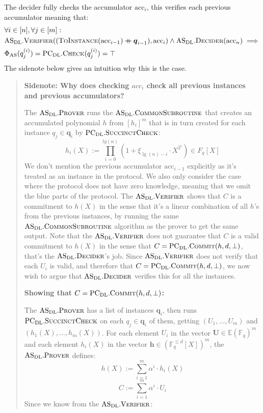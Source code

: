 \documentclass[
]{article}
\newcommand*\Fb{\mathbb{F}}
\newcommand*\Eb{\mathbb{E}}
\renewcommand*\a{\alpha}
\newcommand*\cat{\mathbin{+\mkern-10mu+}}
\renewcommand{\vec}[1]{ \boldsymbol{#1} }
\newcommand*{\acc}{\mathrm{acc}}
\newcommand*{\ToInstance}{\mathrm{\text{T\scriptsize O}\text{I\scriptsize NSTANCE}}}
\newcommand*{\Commit}{\mathrm{\text{C{\scriptsize OMMIT}}}}
\newcommand*{\AS}{\text{AS}}
\newcommand*{\PCDL}{\text{PC}_{\text{DL}}}
\newcommand*{\PCDLCommit}{\PCDL.\Commit}
\newcommand*{\PCDLSuccinctCheck}{\PCDL.\mathrm{\text{S{\scriptsize UCCINCT}C{\scriptsize HECK}}}}
\newcommand*{\PCDLCheck}{\PCDL.\mathrm{\text{C\scriptsize HECK}}}
\newcommand*{\ASDL}{\text{AS}_{\text{DL}}}
\newcommand*{\ASDLCommonSubroutine}{\ASDL.\mathrm{\text{C{\scriptsize OMMON}S{\scriptsize UBROUTINE}}}}
\newcommand*{\ASDLProver}{\ASDL.\mathrm{\text{P\scriptsize ROVER}}}
\newcommand*{\ASDLVerifier}{\ASDL.\mathrm{\text{V\scriptsize ERIFIER}}}
\newcommand*{\ASDLDecider}{\ASDL.\mathrm{\text{D\scriptsize ECIDER}}}
\begin{document}
The decider fully checks the accumulator \(\acc_i\), this verifies each
previous accumulator meaning that: \[
\begin{aligned}
  &\forall i \in [n], \forall j \in [m] : \\
  &\ASDLVerifier((\ToInstance(\acc_{i-1}) \cat \vec{q}_{i-1}), \acc_i) \land \ASDLDecider(\acc_n) \implies \\
  &\Phi_\AS(q^{(i)}_j) = \PCDLCheck(q^{(i)}_j) = \top
\end{aligned}
\] The sidenote below gives an intuition why this is the case.

\begin{quote}
\color{GbGrey}

\textbf{Sidenote: Why does checking $acc_i$ check all previous instances
and previous accumulators?}

The $\ASDLProver$ runs the $\ASDLCommonSubroutine$ that creates an accumulated
polynomial $h$ from $[h_i]^m$ that is in turn created for each instance $q_j
\in \vec{q}_i$ by $\PCDLSuccinctCheck$:
$$h_i(X) := \prod^{lg(n)}_{i=0} (1 + \xi_{\lg(n)-i} \cdot X^{2^i}) \in F_q[X]$$
We don't mention the previous accumulator $\acc_{i-1}$ explicitly as it's
treated as an instance in the protocol. We also only consider the case where
the protocol does not have zero knowledge, meaning that we omit the blue parts
of the protocol. The $\ASDLVerifier$ shows that $C$ is a commitment to $h(X)$
in the sense that it's a linear combination of all $h$'s from the previous
instances, by running the same $\ASDLCommonSubroutine$ algorithm as the prover
to get the same output. Note that the $\ASDLVerifier$ does not guarantee that
$C$ is a valid commitment to $h(X)$ in the sense that $C = \PCDLCommit(h, d,
\bot)$, that's the $\ASDLDecider$'s job. Since $\ASDLVerifier$ does not verify
that each $U_i$ is valid, and therefore that $C = \PCDLCommit(h, d, \bot)$,
we now wish to argue that $\ASDLDecider$ verifies this for all the instances.

\textbf{Showing that $C = \PCDLCommit(h, d, \bot)$:}

The $\ASDLProver$ has a list of instances $\vec{q}_i$, then runs
$\PCDLSuccinctCheck$ on each $q_j \in \vec{q}_i$ of them, getting $(U_1,
\dots, U_m)$ and $(h_1(X), \dots, h_m(X))$. For each element $U_i$ in the
vector $\vec{U} \in \Eb(\Fb_q)^m$ and each element $h_i(X)$ in the vector
$\vec{h} \in (\Fb^{\leq d}_q[X])^m$, the $\ASDLProver$ defines:
$$h(X) := \sum^{m}_{i=1} \a^i \cdot h_i(X)$$
$$C := \sum^{m}_{i=1} \a^i \cdot U_i$$
Since we know from the $\ASDLVerifier$:


\end{quote}
\end{document}
